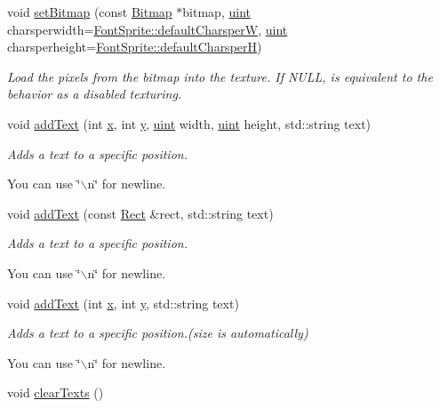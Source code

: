\begin{DoxyCompactItemize}
void \hyperlink{class_f2_c_1_1_font_sprite_a067445bcf9a95c276413091161066cb1}{setBitmap} (const \hyperlink{class_f2_c_1_1_bitmap}{Bitmap} $\ast$bitmap, \hyperlink{namespace_f2_c_a58be2bac9eb3e3c99cb41b6008bf4fae}{uint} charsperwidth=\hyperlink{class_f2_c_1_1_font_sprite_a4391313f8fd3a47ae2b9941d8540a098}{FontSprite::defaultCharsperW}, \hyperlink{namespace_f2_c_a58be2bac9eb3e3c99cb41b6008bf4fae}{uint} charsperheight=\hyperlink{class_f2_c_1_1_font_sprite_a2f7ed6629876bb340c5b3121d0c3a2b0}{FontSprite::defaultCharsperH})
\begin{DoxyCompactList}\small\item\em Load the pixels from the bitmap into the texture. If NULL, is equivalent to the behavior as a disabled texturing. \item\end{DoxyCompactList}\item 
void \hyperlink{class_f2_c_1_1_font_sprite_ae1be1c6e70f794e6b8bf56b60528119e}{addText} (int \hyperlink{class_f2_c_1_1_sprite_base_a552f88034a04e6ac41f22519ac53076c}{x}, int \hyperlink{class_f2_c_1_1_sprite_base_a33a3d48628d9a3130c603eaf902f209f}{y}, \hyperlink{namespace_f2_c_a58be2bac9eb3e3c99cb41b6008bf4fae}{uint} width, \hyperlink{namespace_f2_c_a58be2bac9eb3e3c99cb41b6008bf4fae}{uint} height, std::string text)
\begin{DoxyCompactList}\small\item\em Adds a text to a specific position. \par
 You can use \char`\"{}$\backslash$n\char`\"{} for newline. \item\end{DoxyCompactList}\item 
void \hyperlink{class_f2_c_1_1_font_sprite_a86138fa37543cdf1c28735b175f55fb8}{addText} (const \hyperlink{class_f2_c_1_1_rect}{Rect} \&rect, std::string text)
\begin{DoxyCompactList}\small\item\em Adds a text to a specific position. \par
 You can use \char`\"{}$\backslash$n\char`\"{} for newline. \item\end{DoxyCompactList}\item 
void \hyperlink{class_f2_c_1_1_font_sprite_a6740eab9f282cea96d641f22599c0b9e}{addText} (int \hyperlink{class_f2_c_1_1_sprite_base_a552f88034a04e6ac41f22519ac53076c}{x}, int \hyperlink{class_f2_c_1_1_sprite_base_a33a3d48628d9a3130c603eaf902f209f}{y}, std::string text)
\begin{DoxyCompactList}\small\item\em Adds a text to a specific position.(size is automatically) \par
 You can use \char`\"{}$\backslash$n\char`\"{} for newline. \item\end{DoxyCompactList}\item 
\hypertarget{class_f2_c_1_1_font_sprite_ab293fd22588a8dbe63fb264ea8085e09}{
void \hyperlink{class_f2_c_1_1_font_sprite_ab293fd22588a8dbe63fb264ea8085e09}{clearTexts} ()}
\label{class_f2_c_1_1_font_sprite_ab293fd22588a8dbe63fb264ea8085e09}


\end{DoxyCompactItemize}
